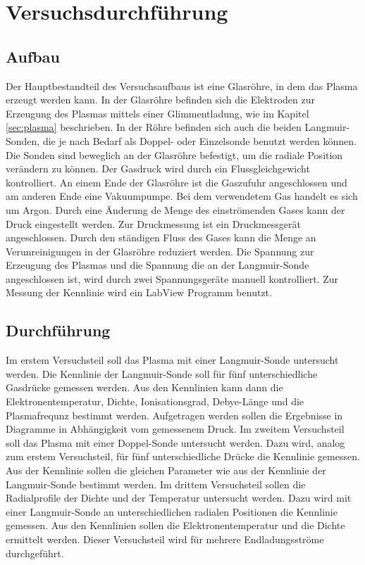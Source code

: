 \section{Versuchsdurchführung}
\subsection{Aufbau}
Der Hauptbestandteil des Versuchsaufbaus ist eine Glasröhre, in dem das Plasma erzeugt werden kann. In der Glasröhre befinden sich die Elektroden zur Erzeugung des Plasmas mittels einer Glimmentladung, wie im Kapitel \ref{sec:plasma} beschrieben. In der Röhre befinden sich auch die beiden Langmuir-Sonden, die je nach Bedarf als Doppel- oder Einzelsonde benutzt werden können. Die Sonden sind beweglich an der Glasröhre befestigt, um die radiale Position verändern zu können. Der Gasdruck wird durch ein Flussgleichgewicht kontrolliert. An einem Ende der Glasröhre ist die Gaszufuhr angeschlossen und am anderen Ende eine Vakuumpumpe. Bei dem verwendetem Gas handelt es sich um Argon. Durch eine Änderung de Menge des einströmenden Gases kann der Druck eingestellt werden. Zur Druckmessung ist ein Druckmessgerät angeschlossen. Durch den ständigen Fluss des Gases kann die Menge an Verunreinigungen in der Glasröhre reduziert werden. Die Spannung zur Erzeugung des Plasmas und die Spannung die an der Langmuir-Sonde angeschlossen ist, wird durch zwei Spannungsgeräte manuell kontrolliert. Zur Messung der Kennlinie wird ein LabView Programm benutzt. 
\subsection{Durchführung}
Im erstem Versuchsteil soll das Plasma mit einer Langmuir-Sonde untersucht werden. Die Kennlinie der Langmuir-Sonde soll für fünf unterschiedliche Gasdrücke gemessen  werden. Aus den Kennlinien kann dann die Elektronentemperatur, Dichte, Ionisationsgrad, Debye-Länge und die Plasmafrequnz bestimmt werden. Aufgetragen werden sollen die Ergebnisse in Diagramme in Abhängigkeit vom gemessenem Druck.
Im zweitem Versuchsteil soll das Plasma mit einer Doppel-Sonde untersucht werden. Dazu wird, analog zum erstem Versuchsteil, für fünf unterschiedliche Drücke die Kennlinie gemessen. Aus der Kennlinie sollen die gleichen Parameter wie aus der Kennlinie der Langmuir-Sonde bestimmt werden. Im drittem Versuchsteil sollen die Radialprofile der Dichte und der Temperatur untersucht werden. Dazu wird mit einer Langmuir-Sonde an unterschiedlichen radialen Positionen die Kennlinie gemessen. Aus den Kennlinien sollen die Elektronentemperatur und die Dichte ermittelt werden. Dieser Versuchsteil wird für mehrere Endladungsströme durchgeführt.